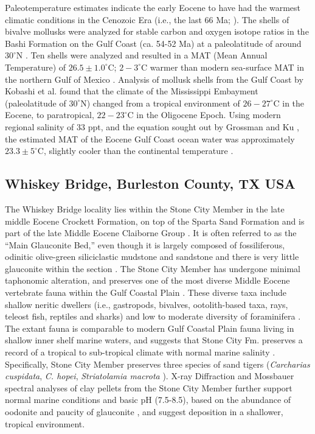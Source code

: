 \documentclass[]{rsos}%
\begin{document}
Paleotemperature estimates indicate the early Eocene to have had the warmest climatic conditions in the Cenozoic Era (i.e., the last 66 Ma; \cite{keating2011warm}). 
The shells of bivalve mollusks were analyzed for stable carbon and oxygen isotope ratios in the Bashi Formation on the Gulf Coast (ca. 54-52 Ma) at a paleolatitude of around $30^\circ$N \cite{keating2011warm}. 
Ten shells were analyzed and resulted in a MAT (Mean Annual Temperature) of $26.5\pm1.0^\circ$C; $2-3^\circ$C warmer than modern sea-surface MAT in the northern Gulf of Mexico \cite{keating2011warm }. 
Analysis of mollusk shells from the Gulf Coast by Kobashi et al. \cite{kobashi2003oxygen} found that the climate of the Mississippi Embayment (paleolatitude of $30^\circ$N) changed from a tropical environment of $26-27^\circ$C in the Eocene, to paratropical, $22-23^\circ$C in the Oligocene Epoch. 
Using modern regional salinity of 33 ppt, and the equation sought out by Grossman and Ku \cite{grossman1986oxygen}, the estimated MAT of the Eocene Gulf Coast ocean water was approximately $23.3 \pm 5^\circ$C, slightly cooler than the continental temperature \cite{kobashi2003oxygen}. 

\subsection{Whiskey Bridge, Burleston County, TX USA}

The Whiskey Bridge locality lies within the Stone City Member in the late middle Eocene Crockett Formation, on top of the Sparta Sand Formation and is part of the late Middle Eocene Claiborne Group \cite{Breard1999, Westgate, harding2014mineralogy, Flis2017}. 
It is often referred to as the “Main Glauconite Bed,” even though it is largely composed of fossiliferous, odinitic olive-green siliciclastic mudstone and sandstone and there is very little glauconite within the section \cite{Breard1999, harding2014mineralogy, Westgate} . 
The Stone City Member has undergone minimal taphonomic alteration, and preserves one of the most diverse Middle Eocene vertebrate fauna within the Gulf Coastal Plain \cite{stanton1980reconstruction}.
These diverse taxa include shallow neritic dwellers (i.e., gastropods, bivalves, ootolith-based taxa, rays, teleost fish, reptiles and sharks) and low to moderate diversity of foraminifera \cite{stanton1980reconstruction, Breard1999}. 
The extant fauna is comparable to modern Gulf Coastal Plain fauna living in shallow inner shelf marine waters, and suggests that Stone City Fm. preserves a record of a tropical to sub-tropical climate with normal marine salinity \cite{Breard1999, harding2014mineralogy, Flis2017}.
Specifically, Stone City Member preserves three species of sand tigers  (\emph{Carcharias cuspidata}, \emph{C. hopei}, \emph{Striatolamia macrota} \cite{Breard1999}). 
X-ray Diffraction and Mossbauer spectral analyses of clay pellets from the Stone City Member further support normal marine conditions and basic pH (7.5-8.5), based on the abundance of oodonite and paucity of glauconite \cite{harding2014mineralogy}, and suggest deposition in a shallower, tropical environment.
\end{document}
